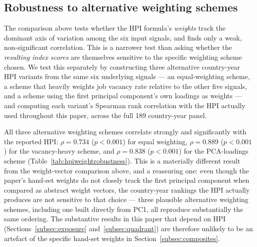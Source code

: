 \documentclass[12pt,a4paper]{article}
\begin{document}
\subsection*{Robustness to alternative weighting schemes}
\label{subsec:hpi_weight_robustness}

The comparison above tests whether the HPI formula's \emph{weights} track the
dominant axis of variation among the six input signals, and finds only a weak,
non-significant correlation.  This is a narrower test than asking whether the
\emph{resulting index scores} are themselves sensitive to the specific
weighting scheme chosen.  We test this separately by constructing three
alternative country-year HPI variants from the same six underlying signals ---
an equal-weighting scheme, a scheme that heavily weights job vacancy rate
relative to the other five signals, and a scheme using the first principal
component's own loadings as weights --- and computing each variant's Spearman
rank correlation with the HPI actually used throughout this paper, across the
full 189 country-year panel.

All three alternative weighting schemes correlate strongly and significantly
with the reported HPI: $\rho=0.734$ ($p<0.001$) for equal weighting,
$\rho=0.889$ ($p<0.001$) for the vacancy-heavy scheme, and $\rho=0.838$
($p<0.001$) for the PCA-loadings scheme (Table~\ref{tab:hpiweightrobustness}).
This is a materially different result from the weight-vector comparison above,
and a reassuring one: even though the paper's hand-set weights do not closely
track the first principal component when compared as abstract weight vectors,
the country-year rankings the HPI actually produces are not sensitive to that
choice --- three plausible alternative weighting schemes, including one built
directly from PC1, all reproduce substantially the same ordering.  The
substantive results in this paper that depend on HPI (Sections~\ref{subsec:exposure}
and~\ref{subsec:quadrant}) are therefore unlikely to be an artefact of the
specific hand-set weights in Section~\ref{subsec:composites}.
\end{document}
